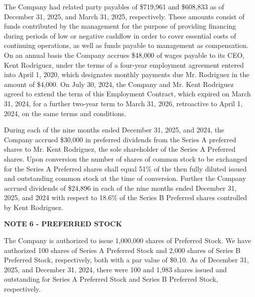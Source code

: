 \documentclass[11pt,a4paper]{article}
\begin{document}
The Company had related party payables of \$719,961 and \$608,833 as of December 31, 2025, and March 31, 2025, respectively. These amounts consist of funds contributed by the management for the purpose of providing financing during periods of low or negative cashflow in order to cover essential costs of continuing operations, as well as funds payable to management as compensation. On an annual basis the Company accrues \$48,000 of wages payable to its CEO, Kent Rodriguez, under the terms of a four-year employment agreement entered into April 1, 2020, which designates monthly payments due Mr. Rodriguez in the amount of \$4,000. On July 30, 2024, the Company and Mr. Kent Rodriguez agreed to extend the term of this Employment Contract, which expired on March 31, 2024, for a further two-year term to March 31, 2026, retroactive to April 1, 2024, on the same terms and conditions.

During each of the nine months ended December 31, 2025, and 2024, the Company accrued \$30,000 in preferred dividends from the Series A preferred shares to Mr. Kent Rodriguez, the sole shareholder of the Series A Preferred shares. Upon conversion the number of shares of common stock to be exchanged for the Series A Preferred shares shall equal 51\% of the then fully diluted issued and outstanding common stock at the time of conversion. Further the Company accrued dividends of \$24,896 in each of the nine months ended December 31, 2025, and 2024 with respect to 18.6\% of the Series B Preferred shares controlled by Kent Rodriguez.

\textbf{NOTE 6 - PREFERRED STOCK}

The Company is authorized to issue 1,000,000 shares of Preferred Stock. We have authorized 100 shares of Series A Preferred Stock and 2,000 shares of Series B Preferred Stock, respectively, both with a par value of \$0.10. As of December 31, 2025, and December 31, 2024, there were 100 and 1,983 shares issued and outstanding for Series A Preferred Stock and Series B Preferred Stock, respectively.
\end{document}
